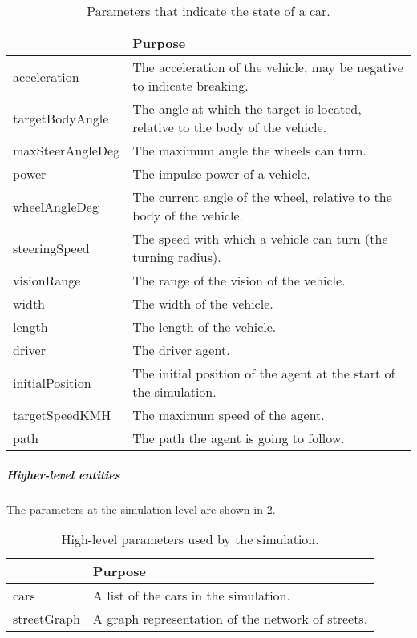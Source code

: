 	\begin{table}[H]
		\centering
		\begin{tabular}{ >{\ttfamily}l  p{10.2cm} }
			\toprule
			\normalfont{Parameter}	& Purpose \\ 
			\midrule
			acceleration 			& The acceleration of the vehicle, may be negative to indicate breaking.\\ 
			targetBodyAngle 		& The angle at which the target is located, relative to the body of the vehicle. \\ 
			maxSteerAngleDeg 		& The maximum angle the wheels can turn. \\ 
			power 					& The impulse power of a vehicle. \\ 
			wheelAngleDeg 			& The current angle of the wheel, relative to the body of the vehicle. \\ 
			steeringSpeed 			& The speed with which a vehicle can turn (the turning radius). \\ 
			visionRange 			& The range of the vision of the vehicle. \\ 
			width 					& The width of the vehicle. \\ 
			length 					& The length of the vehicle. \\ 
			driver 					& The driver agent. \\ 
			initialPosition 		& The initial position of the agent at the start of the simulation. \\ 
			targetSpeedKMH			& The maximum speed of the agent. \\ 
			path					& The path the agent is going to follow. \\ 
			\bottomrule
		\end{tabular}
		\caption{Parameters that indicate the state of a car.}
		\label{tab:par:method:model:overview:state:lowlevel:car}
	\end{table}

	\subparagraph{Higher-level entities}
	The parameters at the simulation level are shown in \cref{tab:par:method:model:overview:state:highlevel:sim}.
	
	\begin{table}[H]
		\centering
		\begin{tabular}{ >{\ttfamily}l  p{10.5cm} }
			\toprule
			\normalfont{Parameter}	& Purpose \\  
			\midrule
			cars 					& A list of the cars in the simulation. \\ 
			streetGraph		 		& A graph representation of the network of streets. \\ 
			\bottomrule
		\end{tabular}
		\caption{High-level parameters used by the simulation.}
		\label{tab:par:method:model:overview:state:highlevel:sim}
	\end{table}


